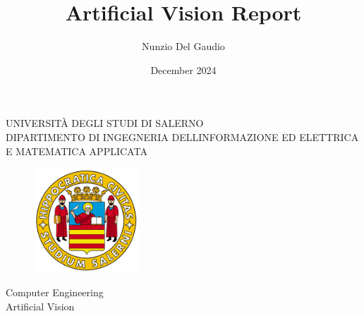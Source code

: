 \documentclass[a4paper, 11pt]{report}
\title{Artificial Vision Report}
\author{Nunzio Del Gaudio}
\date{December 2024}
\begin{document}
	\begin{titlepage}
		\begin{center}
			{\fontsize{20.74}{36}\selectfont\uppercase{Università degli Studi di Salerno}}\\
			\vspace{8mm}
			\uppercase{\large Dipartimento di Ingegneria dell\textquotesingle Informazione ed Elettrica e Matematica applicata}\\
		\end{center}
		\begin{figure}[H]
			\centering
			\includegraphics[width=0.35\textwidth]{logo_unisa.png}
		\end{figure}
		\vspace{1mm}
		\begin{center}
			\large{Computer Engineering}\\
			\vspace{2mm}
			\large{ Artificial Vision}\\
			\vspace{15mm}
			{\fontsize{20.74}{10}\selectfont{\bf Pedestrian attribute recognition}}\\
			\vspace{1mm}
			{\fontsize{14.4}{14.4}\selectfont{\bf competition }}
		\end{center}
		
		\vspace{30mm}
		\noindent
		
		\begin{minipage}[t]{0.3\textwidth}
			{\fontsize{12}{12}\selectfont{ Professors:\\\bf Prof. Mario Vento\\ Prof. Antonio Greco}}
		\end{minipage}
		\hspace{2cm} %
		\begin{minipage}[t]{0.5\textwidth}
			{\fontsize{12}{12}}
		\end{minipage}
		
		\vspace{35mm}
		
		
	\end{titlepage}
	
\end{document}
